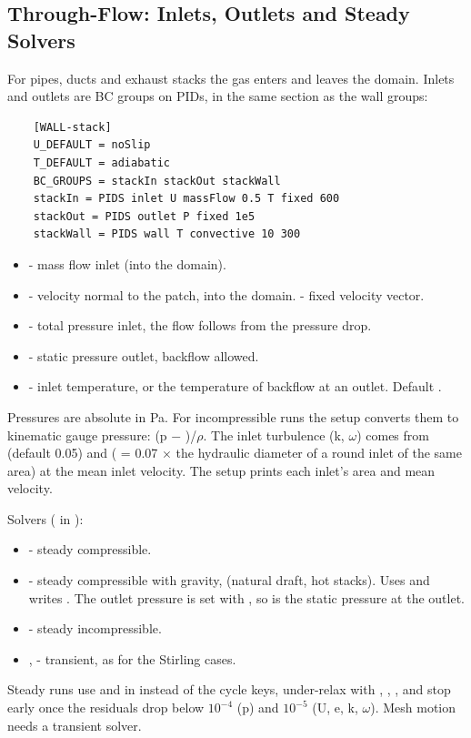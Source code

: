 \subsection{Through-Flow: Inlets, Outlets and Steady Solvers}\label{sec:throughFlow}
For pipes, ducts and exhaust stacks the gas enters and leaves the domain. Inlets and outlets are BC groups on PIDs, in the same  section as the wall groups:
\begin{lstlisting}
    [WALL-stack]
    U_DEFAULT = noSlip
    T_DEFAULT = adiabatic
    BC_GROUPS = stackIn stackOut stackWall
    stackIn = PIDS inlet U massFlow 0.5 T fixed 600
    stackOut = PIDS outlet P fixed 1e5
    stackWall = PIDS wall T convective 10 300
\end{lstlisting}
\begin{itemize}
    \item {} - mass flow inlet (into the domain).
    \item {} - velocity normal to the patch, into the domain.  - fixed velocity vector.
    \item {} - total pressure inlet, the flow follows from the pressure drop.
    \item {} - static pressure outlet, backflow allowed.
    \item {} - inlet temperature, or the temperature of backflow at an outlet. Default .
\end{itemize}
Pressures are absolute in Pa. For incompressible runs the setup converts them to kinematic gauge pressure: (p $-$ )/$\rho$. The inlet turbulence (k, $\omega$) comes from  (default 0.05) and  ( = 0.07 $\times$ the hydraulic diameter of a round inlet of the same area) at the mean inlet velocity. The setup prints each inlet's area and mean velocity.

Solvers ( in ):
\begin{itemize}
    \item {} - steady compressible.
    \item {} - steady compressible with gravity,  (natural draft, hot stacks). Uses  and writes . The outlet pressure is set with , so  is the static pressure at the outlet.
    \item {} - steady incompressible.
    \item {},  - transient, as for the Stirling cases.
\end{itemize}
Steady runs use  and  in  instead of the cycle keys, under-relax with , , , and stop early once the residuals drop below $10^{-4}$ (p) and $10^{-5}$ (U, e, k, $\omega$). Mesh motion needs a transient solver.

